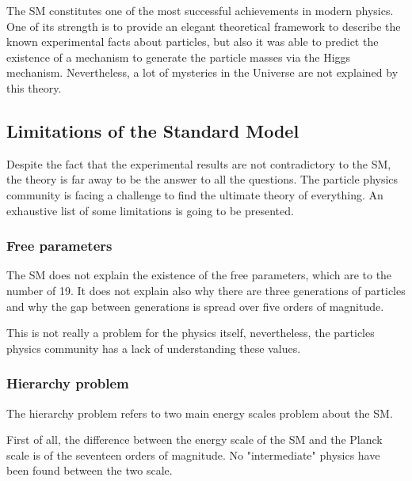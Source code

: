   The \gls{SM} constitutes one of the most successful achievements in modern physics.
  One of its strength is to provide an elegant theoretical framework to describe the known experimental facts about particles, but also it was able to predict 
  the existence of a mechanism to generate the particle masses via the Higgs mechanism.
  Nevertheless, a lot of mysteries in the Universe are not explained by this theory. 
  
  \subsection{Limitations of the Standard Model}

  Despite the fact that the experimental results are not contradictory to the \gls{SM}, the theory is far away to be the answer to all the questions.
  The particle physics community is facing a challenge to find the ultimate theory of everything.
  An exhaustive list of some limitations is going to be presented.

    \subsubsection{Free parameters}

    The \gls{SM} does not explain the existence of the free parameters, which are to the number of 19.
    It does not explain also why there are three generations of particles and why the gap between generations is spread over five orders of magnitude.

    This is not really a problem for the physics itself, nevertheless, the particles physics community has a lack of understanding these values.
  
    \subsubsection{Hierarchy problem}

    The hierarchy problem refers to two main energy scales problem about the \gls{SM}.

    First of all, the difference between the energy scale of the \gls{SM} and the Planck scale is of the seventeen orders of magnitude.
    No "intermediate" physics have been found between the two scale.

